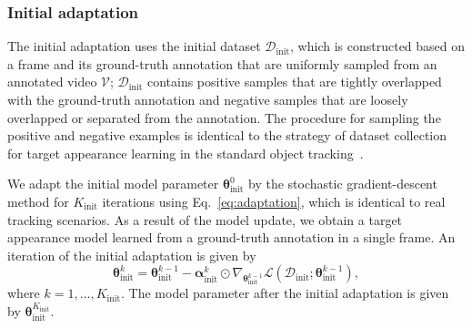 \documentclass[letterpaper]{article} %
\def \datainit{\mathcal{D}_\text{init}}
\def \thetainit{{\boldsymbol{\theta}_\text{init}^0}}
\def \thetainitadapt{\boldsymbol{\theta}_\text{init}}
\def \alphainit{\boldsymbol{\alpha}_\text{init}}
\def \Kinit{K_\text{init}}
\begin{document}
\subsubsection{Initial adaptation} 
The initial adaptation uses the initial dataset $\datainit$, which is constructed based on a frame and its ground-truth annotation that are uniformly sampled from an annotated video $\mathcal{V}$;
$\datainit$ contains positive samples that are tightly overlapped with the ground-truth annotation and negative samples that are loosely overlapped or separated from the annotation.
The procedure for sampling the positive and negative examples is identical to the strategy of dataset collection for target appearance learning in the standard object tracking~\cite{jung2018realtime}.

We adapt the initial model parameter $\thetainit$ by the stochastic gradient-descent method for $\Kinit$ iterations using Eq.~\eqref{eq:adaptation}, which is identical to real tracking scenarios.
As a result of the model update, we obtain a target appearance model learned from a ground-truth annotation in a single frame.
An iteration of the initial adaptation is given by
%
\begin{equation}
\thetainitadapt^k = \thetainitadapt^{k-1} - \alphainit^k \odot \nabla_{\thetainitadapt^{k-1}}\mathcal{L}(\datainit ; \thetainitadapt^{k-1}),
\label{eq:strong_adaptation}
\end{equation}
%
where  $k=1, \dots, \Kinit$.
The model parameter after the initial adaptation is given by $\thetainitadapt^{\Kinit}$.


\end{document}
